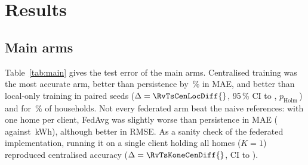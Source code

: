 \section{Results}

\subsection{Main arms}
Table~\ref{tab:main} gives the test error of the main arms. Centralised training was the most accurate arm, better than
persistence by \RvCentralVsPersist{}\,\% in MAE, and better than local-only training in \RvTsCenLocSeeds{} paired seeds
($\Delta=\RvTsCenLocDiff{}$, 95\,\% CI \RvTsCenLocLo{} to \RvTsCenLocHi{}, $p_{\mathrm{Holm}}$\,\RvTsCenLocP{}) and for
\RvTsCenLocHH{}\,\% of households.
Not every federated arm beat the naive references: with one home per client, FedAvg was slightly worse than persistence
in MAE (\EonethreefedavghouseholdMAE{} against \PersistenceMAE{}\,kWh), although better in RMSE. As a sanity check of
the federated implementation, running it on a single client holding all homes ($K=1$) reproduced centralised accuracy
($\Delta=\RvTsKoneCenDiff{}$, CI \RvTsKoneCenLo{} to \RvTsKoneCenHi{}).


